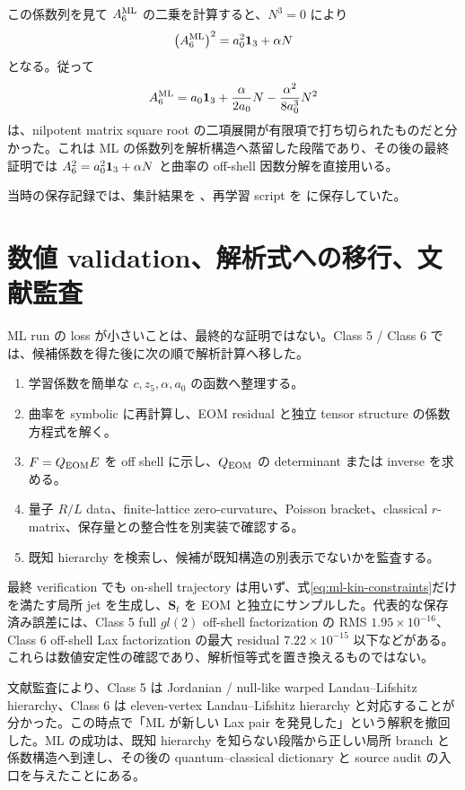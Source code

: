 この係数列を見て $A_6^{\rm ML}$ の二乗を計算すると、$N^3=0$ により
\begin{equation}
\left(A_6^{\rm ML}\right)^2=a_0^2\mathbf 1_{3}+\alpha N
\label{eq:ml6-square}
\end{equation}
となる。従って
\begin{equation}
A_6^{\rm ML}
=a_0\mathbf 1_{3}
+\frac{\alpha}{2a_0}N
-\frac{\alpha^2}{8a_0^3}N^2
\label{eq:ml6-root}
\end{equation}
は、nilpotent matrix square root の二項展開が有限項で打ち切られたものだと分かった。これは ML の係数列を解析構造へ蒸留した段階であり、その後の最終証明では $A_6^2=a_0^2\mathbf 1_{3}+\alpha N$ と曲率の off-shell 因数分解を直接用いる。

当時の保存記録では、集計結果を 、再学習 script を  に保存していた。

\section{数値 validation、解析式への移行、文献監査}
\label{sec:ml-validation}
ML run の loss が小さいことは、最終的な証明ではない。Class 5 / Class 6 では、候補係数を得た後に次の順で解析計算へ移した。
\begin{enumerate}[leftmargin=2.5em]
\item 学習係数を簡単な $c,z_5,\alpha,a_0$ の函数へ整理する。
\item 曲率を symbolic に再計算し、EOM residual と独立 tensor structure の係数方程式を解く。
\item $F=Q_{\rm EOM}E$ を off shell に示し、$Q_{\rm EOM}$ の determinant または inverse を求める。
\item 量子 $R/L$ data、finite-lattice zero-curvature、Poisson bracket、classical $r$-matrix、保存量との整合性を別実装で確認する。
\item 既知 hierarchy を検索し、候補が既知構造の別表示でないかを監査する。
\end{enumerate}

最終 verification でも on-shell trajectory は用いず、式\eqref{eq:ml-kin-constraints}だけを満たす局所 jet を生成し、$\boldsymbol S_t$ を EOM と独立にサンプルした。代表的な保存済み誤差には、Class 5 full $gl(2)$ off-shell factorization の RMS $1.95\times10^{-16}$、Class 6 off-shell Lax factorization の最大 residual $7.22\times10^{-15}$ 以下などがある。これらは数値安定性の確認であり、解析恒等式を置き換えるものではない。

文献監査により、Class 5 は Jordanian / null-like warped Landau--Lifshitz hierarchy、Class 6 は eleven-vertex Landau--Lifshitz hierarchy と対応することが分かった。この時点で「ML が新しい Lax pair を発見した」という解釈を撤回した。ML の成功は、既知 hierarchy を知らない段階から正しい局所 branch と係数構造へ到達し、その後の quantum--classical dictionary と source audit の入口を与えたことにある。

